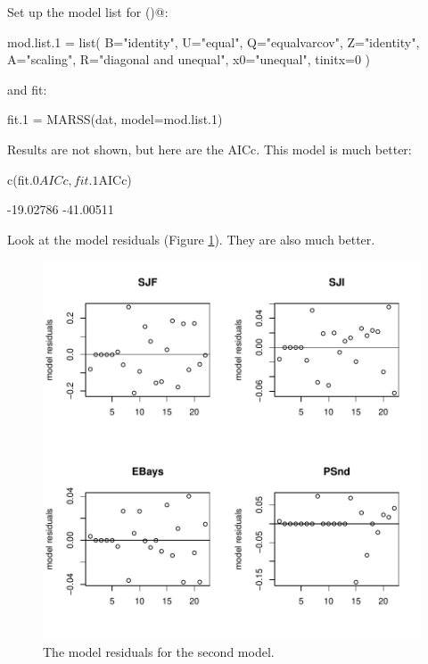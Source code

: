 Set up the model list for \verb@MARSS()@:
\begin{Schunk}
\begin{Sinput}
 mod.list.1 = list(
 B="identity",
 U="equal",
 Q="equalvarcov",
 Z="identity",
 A="scaling",
 R="diagonal and unequal",
 x0="unequal",
 tinitx=0 )
\end{Sinput}
\end{Schunk}
and fit:
\begin{Schunk}
\begin{Sinput}
 fit.1 = MARSS(dat, model=mod.list.1)
\end{Sinput}
\end{Schunk}
Results are not shown, but here are the AICc.  This model is much better:
\begin{Schunk}
\begin{Sinput}
 c(fit.0$AICc, fit.1$AICc)
\end{Sinput}
\begin{Soutput}
[1] -19.02786 -41.00511
\end{Soutput}
\end{Schunk}

Look at the model residuals (Figure \ref{fig:mss.resids.1}).  They are also much better.
\begin{figure}[htp]
\begin{center}
\includegraphics{./figures/MSS--mss_model_resids_1}
\end{center}
\caption{The model residuals for the second model.}
\label{fig:mss.resids.1}
\end{figure}

